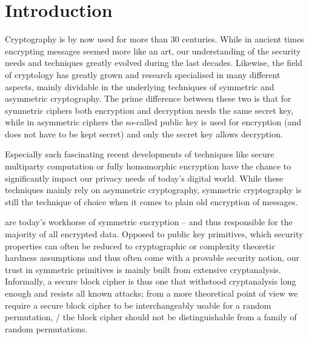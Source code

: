 \chapter{Introduction}

Cryptography is by now used for more than 30 centuries.
While in ancient times encrypting messages seemed more like an art, our understanding of the security needs and techniques greatly evolved during the last decades.
Likewise, the field of cryptology has greatly grown and research specialised in many different aspects, mainly dividable in the underlying techniques of symmetric and asymmetric cryptography.
The prime difference between these two is that for symmetric ciphers both encryption and decryption needs the same secret key, while in asymmetric ciphers the so-called public key is used for encryption (and does not have to be kept secret) and only the secret key allows decryption.

Especially such fascinating recent developments of techniques like secure multiparty computation or fully homomorphic encryption have the chance to significantly impact our privacy needs of today's digital world.
While these techniques mainly rely on asymmetric cryptography, symmetric cryptography is still the technique of choice when it comes to plain old encryption of messages.

\hspace{1.5em} are today's workhorse of symmetric encryption
-- and thus responsible for the majority of all encrypted data.
Opposed to public key primitives, which security properties can often be reduced to cryptographic or complexity theoretic hardness assumptions and thus often come with a provable security notion, our trust in symmetric primitives is mainly built from extensive cryptanalysis.
Informally, a secure block cipher is thus one that withstood cryptanalysis long enough and resists all known attacks; from a more theoretical point of view we require a secure block cipher to be interchangeably usable for a random permutation, \ie/ the block cipher should not be distinguishable from a family of random permutations.


